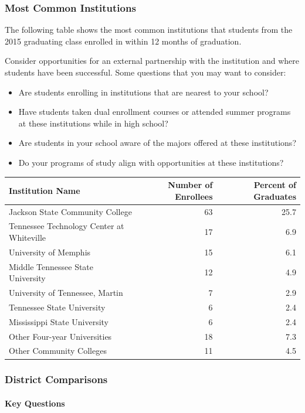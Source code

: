 \documentclass[11pt,]{article}
\providecommand{\tightlist}{%
  \setlength{\itemsep}{0pt}\setlength{\parskip}{0pt}}
\let\oldparagraph\paragraph
\renewcommand{\paragraph}[1]{\oldparagraph{#1}\mbox{}}
\begin{document}
\subsubsection{Most Common Institutions}\label{most-common-institutions}

The following table shows the most common institutions that students
from the 2015 graduating class enrolled in within 12 months of
graduation.

Consider opportunities for an external partnership with the institution
and where students have been successful. Some questions that you may
want to consider:

\begin{itemize}
\tightlist
\item
  Are students enrolling in institutions that are nearest to your
  school?
\item
  Have students taken dual enrollment courses or attended summer
  programs at these institutions while in high school?
\item
  Are students in your school aware of the majors offered at these
  institutions?
\item
  Do your programs of study align with opportunities at these
  institutions?
\end{itemize}

\begin{longtable}[]{@{}lrr@{}}
\toprule
Institution Name & Number of Enrollees & Percent of
Graduates\tabularnewline
\midrule
\endhead
Jackson State Community College & 63 & 25.7\tabularnewline
Tennessee Technology Center at Whiteville & 17 & 6.9\tabularnewline
University of Memphis & 15 & 6.1\tabularnewline
Middle Tennessee State University & 12 & 4.9\tabularnewline
University of Tennessee, Martin & 7 & 2.9\tabularnewline
Tennessee State University & 6 & 2.4\tabularnewline
Mississippi State University & 6 & 2.4\tabularnewline
Other Four-year Universities & 18 & 7.3\tabularnewline
Other Community Colleges & 11 & 4.5\tabularnewline
\bottomrule
\end{longtable}

\newpage 

\subsubsection{District Comparisons}\label{district-comparisons-1}

\paragraph{Key Questions}\label{key-questions-1}
\end{document}

